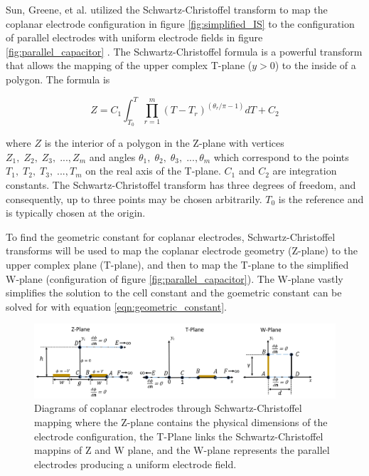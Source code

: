  
    \par Sun, Greene, et al. utilized the Schwartz-Christoffel transform to map the coplanar electrode configuration in figure \ref{fig:simplified_IS} to the configuration of parallel electrodes with uniform electrode fields in figure \ref{fig:parallel_capacitor} \cite{sun_analytical_2007}. The Schwartz-Christoffel formula is a powerful transform that allows the mapping of the upper complex T-plane ($y>0$) to the inside of a polygon. The formula is
    
    \begin{equation}
        Z = C_1 \int_{T_0}^T \prod^m_{r=1} (T - T_r)^{(\theta_r/\pi - 1)} dT + C_2
    \end{equation}
    
    \noindent where $Z$ is the interior of a polygon in the Z-plane with vertices $Z_1,\;Z_2,\;Z_3,\; ...,Z_m$ and angles $\theta_1,\;\theta_2,\;\theta_3,\; ...,\theta_m$ which correspond to the points $T_1,\;T_2,\;T_3,\; ...,T_m$ on the real axis of the T-plane. $C_1$ and $C_2$ are integration constants. The Schwartz-Christoffel transform has three degrees of freedom, and consequently, up to three points may be chosen arbitrarily. $T_0$ is the reference and is typically chosen at the origin.
    
    \par To find the geometric constant for coplanar electrodes, Schwartz-Christoffel transforms will be used to map the coplanar electrode geometry (Z-plane) to the upper complex plane (T-plane), and then to map the T-plane to the simplified W-plane (configuration of figure \ref{fig:parallel_capacitor}). The W-plane vastly simplifies the solution to the cell constant and the goemetric constant can be solved for with equation \ref{eqn:geometric_constant}. 
    
    \begin{figure}[h]
        \centering
        \includegraphics[width=\textwidth]{images/scmPlanes.png}
        \caption[Diagrams of coplanar electrodes through Schwartz-Christoffel mapping]{Diagrams of coplanar electrodes through Schwartz-Christoffel mapping where the Z-plane contains the physical dimensions of the electrode configuration, the T-Plane links the Schwartz-Christoffel mappins of Z and W plane, and the W-plane represents the parallel electrodes producing a uniform electrode field.}
        \label{fig:scm_planes}
    \end{figure}
    
